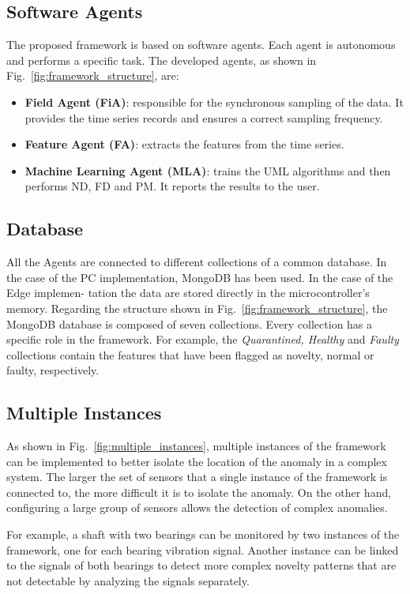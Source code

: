 \subsection{Software Agents}
The proposed framework is based on software agents. Each agent is autonomous and performs a specific task. The developed agents, as shown in Fig.~\ref{fig:framework_structure}, are:
\begin{itemize}
    \item \textbf{Field Agent (FiA)}: responsible for the synchronous sampling of the data. It provides the time series records and ensures a correct sampling frequency.
    \item \textbf{Feature Agent (FA)}: extracts the features from the time series.
    \item \textbf{Machine Learning Agent (MLA)}: trains the UML algorithms and then performs ND, FD and PM. It reports the results to the user.
\end{itemize}

\subsection{Database}
{
All the Agents are connected to different collections of a common database. In the case of the PC implementation, MongoDB has been used. In the case of the Edge implemen- tation the data are stored directly in the microcontroller's memory.
Regarding the structure shown in Fig.~\ref{fig:framework_structure}, the MongoDB database is composed of seven collections. Every collection has a specific role in the framework. For example, the \emph{Quarantined, Healthy} and \emph{Faulty} collections contain the features that have been flagged as novelty, normal or faulty, respectively.
}

\subsection{Multiple Instances}
As shown in Fig.~\ref{fig:multiple_instances}, multiple instances of the framework can be implemented to better isolate the location of the anomaly in a complex system. The larger the set of sensors that a single instance of the framework is connected to, the more difficult it is to isolate the anomaly. On the other hand, configuring a large group of sensors allows the detection of complex anomalies. 

For example, a shaft with two bearings can be monitored by two instances of the framework, one for each bearing vibration signal. Another instance can be linked to the signals of both bearings to detect more complex novelty patterns that are not detectable by analyzing the signals separately.   

